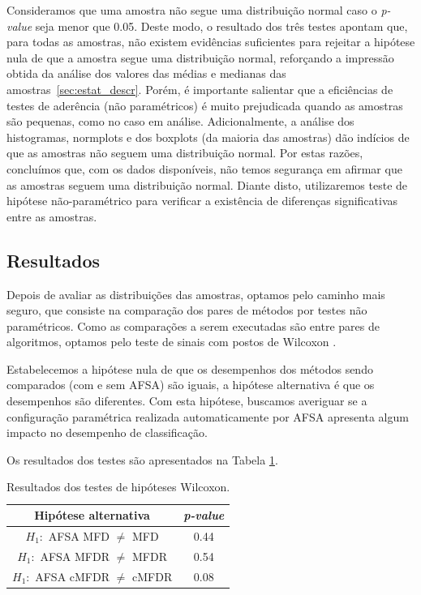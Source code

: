 \documentclass[conference]{IEEEtran}
\begin{document}
Consideramos que uma amostra não segue uma distribuição normal caso o \textit{p-value} seja menor que 0.05.
Deste modo, o resultado dos três testes apontam que, para todas as amostras, não existem evidências suficientes para rejeitar a hipótese nula de que a amostra segue uma distribuição normal, reforçando a impressão obtida da análise dos valores das médias e medianas das amostras~\ref{sec:estat_descr}.
Porém, é importante salientar que a eficiências de testes de aderência (não paramétricos) é muito prejudicada quando as amostras são pequenas, como no caso em análise.
Adicionalmente, a análise dos histogramas, normplots e dos boxplots (da maioria das amostras) dão indícios de que as amostras não seguem uma distribuição normal.
Por estas razões, concluímos que, com os dados disponíveis, não temos segurança em afirmar que as amostras seguem uma distribuição normal.
Diante disto, utilizaremos teste de hipótese não-paramétrico para verificar a existência de diferenças significativas entre as amostras.

\subsection{Resultados}

Depois de avaliar as distribuições das amostras, optamos pelo caminho mais seguro, que consiste na comparação dos pares de métodos por testes não paramétricos. 
Como as comparações a serem executadas são entre pares de algoritmos, optamos pelo teste de sinais com postos de Wilcoxon \cite{wilcoxon1945individual}.

Estabelecemos a hipótese nula de que os desempenhos dos métodos sendo comparados (com e sem AFSA) são iguais, a hipótese alternativa é que os desempenhos são diferentes. Com esta hipótese, buscamos averiguar se a configuração paramétrica realizada automaticamente por AFSA apresenta algum impacto no desempenho de classificação.

Os resultados dos testes são apresentados na Tabela 
\ref{tab:rank_sum}.

\begin{table}[h]
	\centering
	\caption{Resultados dos testes de hipóteses Wilcoxon.}
	\label{tab:rank_sum}
	\begin{tabular}{c|c}
		\hline
		Hipótese alternativa							& \textit{p-value}\\
		\hline
		$H_1:$ AFSA MFD $\neq$ MFD   			& 0.44    \\
		$H_1:$ AFSA MFDR  $\neq$ MFDR			& 0.54    \\
		$H_1:$ AFSA cMFDR $\neq$ cMFDR			& 0.08    \\
		\hline
	\end{tabular}
\end{table}
\end{document}
